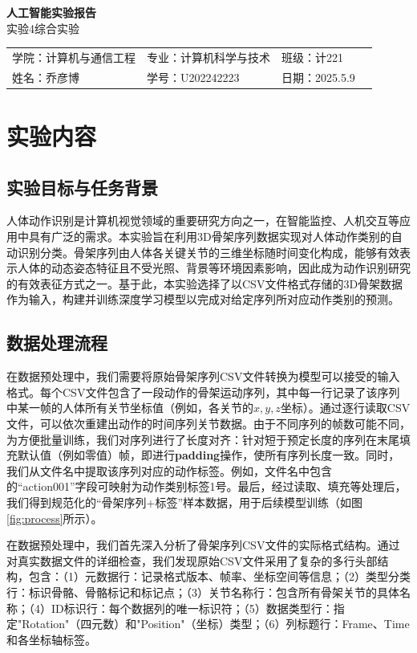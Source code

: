 \documentclass[UTF8]{article}
\begin{document}
\begin{center}
  {\bfseries 人工智能实验报告}\\[1ex]
  { 实验4\quad 综合实验}
\end{center}

\renewcommand{\arraystretch}{1.6}
\begin{tabular}{p{5cm}p{5.5cm}p{3cm}p{5.5cm}}
  学院：计算机与通信工程 & 专业：计算机科学与技术 & 班级：计221\\
  姓名：乔彦博 & 学号：U202242223 & 日期：2025.5.9\\
\end{tabular}

\section{实验内容}

\subsection{实验目标与任务背景}

人体动作识别是计算机视觉领域的重要研究方向之一，在智能监控、人机交互等应用中具有广泛的需求。本实验旨在利用3D骨架序列数据实现对人体动作类别的自动识别分类。骨架序列由人体各关键关节的三维坐标随时间变化构成，能够有效表示人体的动态姿态特征且不受光照、背景等环境因素影响，因此成为动作识别研究的有效表征方式之一。基于此，本实验选择了以CSV文件格式存储的3D骨架数据作为输入，构建并训练深度学习模型以完成对给定序列所对应动作类别的预测。

\subsection{数据处理流程}

在数据预处理中，我们需要将原始骨架序列CSV文件转换为模型可以接受的输入格式。每个CSV文件包含了一段动作的骨架运动序列，其中每一行记录了该序列中某一帧的人体所有关节坐标值（例如，各关节的$x, y, z$坐标）。通过逐行读取CSV文件，可以依次重建出动作的时间序列关节数据。由于不同序列的帧数可能不同，为方便批量训练，我们对序列进行了长度对齐：针对短于预定长度的序列在末尾填充默认值（例如零值）帧，即进行\textbf{padding}操作，使所有序列长度一致。同时，我们从文件名中提取该序列对应的动作标签。例如，文件名中包含的``action001''字段可映射为动作类别标签1号。最后，经过读取、填充等处理后，我们得到规范化的“骨架序列+标签”样本数据，用于后续模型训练（如图\ref{fig:process}所示）。

在数据预处理中，我们首先深入分析了骨架序列CSV文件的实际格式结构。通过对真实数据文件的详细检查，我们发现原始CSV文件采用了复杂的多行头部结构，包含：（1）元数据行：记录格式版本、帧率、坐标空间等信息；（2）类型分类行：标识骨骼、骨骼标记和标记点；（3）关节名称行：包含所有骨架关节的具体名称；（4）ID标识行：每个数据列的唯一标识符；（5）数据类型行：指定"Rotation"（四元数）和"Position"（坐标）类型；（6）列标题行：Frame、Time和各坐标轴标签。
\end{document}
